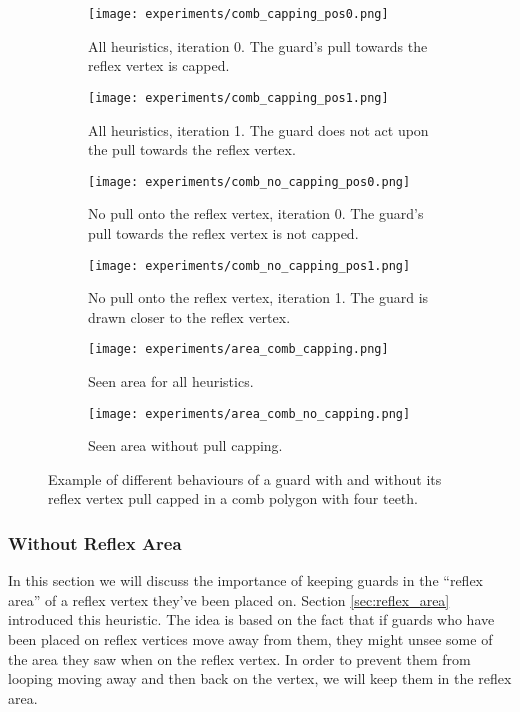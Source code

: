\begin{figure}[h!]
    \centering
    \begin{subfigure}{0.45\textwidth}
        \texttt{[image: experiments/comb\_capping\_pos0.png]}
        \caption{All heuristics, iteration 0. The guard's pull towards the reflex vertex is capped.}
        \label{fig:all_cap_pos0}
    \end{subfigure}
    \hfill
    \begin{subfigure}{0.45\textwidth}
        \texttt{[image: experiments/comb\_capping\_pos1.png]}
        \caption{All heuristics, iteration 1. The guard does not act upon the pull towards the reflex vertex.}
        \label{fig:all_cap_pos1}
    \end{subfigure}
    \vfill
    \begin{subfigure}{0.45\textwidth}
        \texttt{[image: experiments/comb\_no\_capping\_pos0.png]}
        \caption{No pull onto the reflex vertex, iteration 0. The guard's pull towards the reflex vertex is not capped.}
        \label{fig:no_cap_pos0}
    \end{subfigure}
    \hfill
    \begin{subfigure}{0.45\textwidth}
        \texttt{[image: experiments/comb\_no\_capping\_pos1.png]}
        \caption{No pull onto the reflex vertex, iteration 1. The guard is drawn closer to the reflex vertex.}
        \label{fig:no_cap_pos1}
    \end{subfigure}
    \vfill
    \begin{subfigure}{0.45\textwidth}
        \texttt{[image: experiments/area\_comb\_capping.png]}
        \caption{Seen area for all heuristics.}
        \label{fig:area_all_cap}
    \end{subfigure}
    \hfill
    \begin{subfigure}{0.45\textwidth}
        \texttt{[image: experiments/area\_comb\_no\_capping.png]}
        \caption{Seen area without pull capping.}
        \label{fig:area_no_cap}
    \end{subfigure}
    \caption{Example of different behaviours of a guard with and without its reflex vertex pull capped in a comb polygon with four teeth.}
    \label{fig:no_capping}
\end{figure}

\subsubsection{Without Reflex Area}
In this section we will discuss the importance of keeping guards in the ``reflex area'' of a reflex vertex they've been placed on. Section \ref{sec:reflex_area} introduced this heuristic. The idea is based on the fact that if guards who have been placed on reflex vertices move away from them, they might unsee some of the area they saw when on the reflex vertex. In order to prevent them from looping moving away and then back on the vertex, we will keep them in the reflex area.

